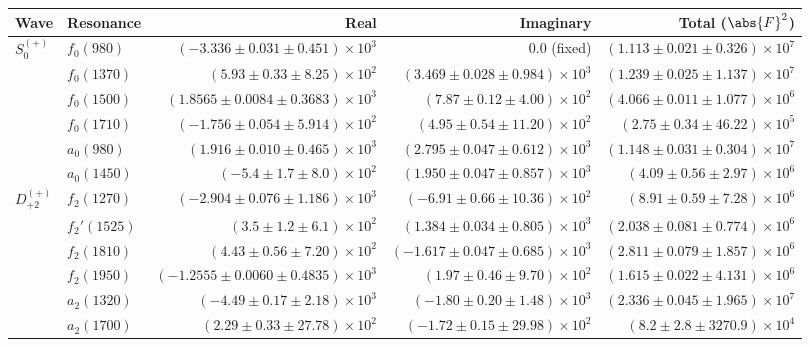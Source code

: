 \begin{table}[ht]
    \begin{center}
        \begin{tabular}{llrrr}\toprule
        Wave & Resonance & Real & Imaginary & Total ($\abs{F}^2$) \\\midrule
$S_{0}^{(+)}$ & $f_{0}(980)$ & $(-3.336 \pm 0.031 \pm 0.451) \times 10^{3}$ & $0.0$ (fixed) & $(1.113 \pm 0.021 \pm 0.326) \times 10^{7}$ \\
 & $f_{0}(1370)$ & $(5.93 \pm 0.33 \pm 8.25) \times 10^{2}$ & $(3.469 \pm 0.028 \pm 0.984) \times 10^{3}$ & $(1.239 \pm 0.025 \pm 1.137) \times 10^{7}$ \\
 & $f_{0}(1500)$ & $(1.8565 \pm 0.0084 \pm 0.3683) \times 10^{3}$ & $(7.87 \pm 0.12 \pm 4.00) \times 10^{2}$ & $(4.066 \pm 0.011 \pm 1.077) \times 10^{6}$ \\
 & $f_{0}(1710)$ & $(-1.756 \pm 0.054 \pm 5.914) \times 10^{2}$ & $(4.95 \pm 0.54 \pm 11.20) \times 10^{2}$ & $(2.75 \pm 0.34 \pm 46.22) \times 10^{5}$ \\
 & $a_{0}(980)$ & $(1.916 \pm 0.010 \pm 0.465) \times 10^{3}$ & $(2.795 \pm 0.047 \pm 0.612) \times 10^{3}$ & $(1.148 \pm 0.031 \pm 0.304) \times 10^{7}$ \\
 & $a_{0}(1450)$ & $(-5.4 \pm 1.7 \pm 8.0) \times 10^{2}$ & $(1.950 \pm 0.047 \pm 0.857) \times 10^{3}$ & $(4.09 \pm 0.56 \pm 2.97) \times 10^{6}$ \\
$D_{+2}^{(+)}$ & $f_{2}(1270)$ & $(-2.904 \pm 0.076 \pm 1.186) \times 10^{3}$ & $(-6.91 \pm 0.66 \pm 10.36) \times 10^{2}$ & $(8.91 \pm 0.59 \pm 7.28) \times 10^{6}$ \\
 & $f_{2}'(1525)$ & $(3.5 \pm 1.2 \pm 6.1) \times 10^{2}$ & $(1.384 \pm 0.034 \pm 0.805) \times 10^{3}$ & $(2.038 \pm 0.081 \pm 0.774) \times 10^{6}$ \\
 & $f_{2}(1810)$ & $(4.43 \pm 0.56 \pm 7.20) \times 10^{2}$ & $(-1.617 \pm 0.047 \pm 0.685) \times 10^{3}$ & $(2.811 \pm 0.079 \pm 1.857) \times 10^{6}$ \\
 & $f_{2}(1950)$ & $(-1.2555 \pm 0.0060 \pm 0.4835) \times 10^{3}$ & $(1.97 \pm 0.46 \pm 9.70) \times 10^{2}$ & $(1.615 \pm 0.022 \pm 4.131) \times 10^{6}$ \\
 & $a_{2}(1320)$ & $(-4.49 \pm 0.17 \pm 2.18) \times 10^{3}$ & $(-1.80 \pm 0.20 \pm 1.48) \times 10^{3}$ & $(2.336 \pm 0.045 \pm 1.965) \times 10^{7}$ \\
 & $a_{2}(1700)$ & $(2.29 \pm 0.33 \pm 27.78) \times 10^{2}$ & $(-1.72 \pm 0.15 \pm 29.98) \times 10^{2}$ & $(8.2 \pm 2.8 \pm 3270.9) \times 10^{4}$ \\

\end{tabular}
\end{center}
\end{table}
